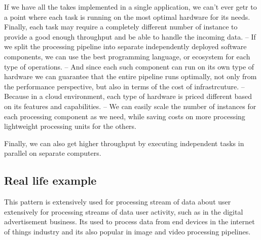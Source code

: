 \documentclass[a4paper, 11pt]{book}
\begin{document}
    If we have all the takes implemented in a single application, we can't ever getr to a point where each task is running on the most optimal hardware for its needs.
    Finally, each task may require a completely different number of instance to provide a good enough throughput and be able to handle the incoming data.
    -- If we split the processing pipeline into separate independently deployed software components, we can use the best programming language, or ecosystem for each type of operations.
    -- And since each such component can run on its own type of hardware we can guarantee that the entire pipeline runs optimally, not only from the performance perspective, but also in terms of the cost of infrastrcuture.
    -- Because in a cloud environment, each type of hardware is priced different based on its features and capabilities.
    -- We can easily scale the number of instances for each processing component as we need, while saving costs on more processing lightweight processing units for the others.

    Finally, we can also get higher throughput by executing independent tasks in parallel on separate computers.

    \subsection{Real life example}
    This pattern is extensively used for processing stream of data about user extensively for processing streams of data user activity, such as in the digital advertisement business.
    Its used to process data from end devices in the internet of things industry and its also popular in image and video processing pipelines.
\end{document}
